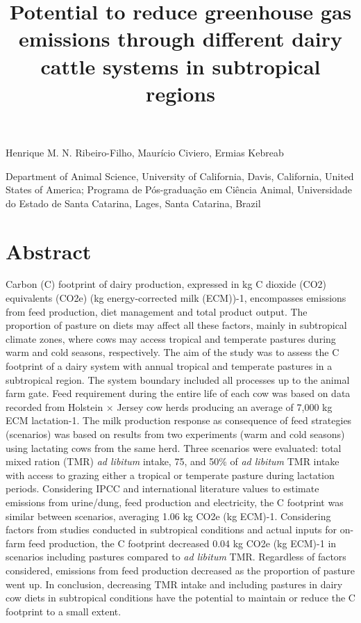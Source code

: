 \documentclass[11pt,a4paper]{article}
\title{Potential to reduce greenhouse gas emissions through different dairy cattle systems in subtropical regions}
\begin{document}
\maketitle

Henrique M. N. Ribeiro-Filho, Maurício Civiero, Ermias Kebreab

Department of Animal Science, University of California, Davis, California, United States of America; Programa de Pós-graduação em Ciência Animal, Universidade do Estado de Santa Catarina, Lages, Santa Catarina, Brazil

\section{Abstract}

Carbon (C) footprint of dairy production, expressed in kg C dioxide (CO2) equivalents (CO2e) (kg energy-corrected milk (ECM))-1, encompasses emissions from feed production, diet management and total product output. The proportion of pasture on diets may affect all these factors, mainly in subtropical climate zones, where cows may access tropical and temperate pastures during warm and cold seasons, respectively. The aim of the study was to assess the C footprint of a dairy system with annual tropical and temperate pastures in a subtropical region. The system boundary included all processes up to the animal farm gate. Feed requirement during the entire life of each cow was based on data recorded from Holstein × Jersey cow herds producing an average of 7,000 kg ECM lactation-1. The milk production response as consequence of feed strategies (scenarios) was based on results from two experiments (warm and cold seasons) using lactating cows from the same herd. Three scenarios were evaluated: total mixed ration (TMR) \textit{ad libitum} intake, 75, and 50\% of \textit{ad libitum} TMR intake with access to grazing either a tropical or temperate pasture during lactation periods. Considering IPCC and international literature values to estimate emissions from urine/dung, feed production and electricity, the C footprint was similar between scenarios, averaging 1.06 kg CO2e (kg ECM)-1. Considering factors from studies conducted in subtropical conditions and actual inputs for on-farm feed production, the C footprint decreased 0.04 kg CO2e (kg ECM)-1 in scenarios including pastures compared to \textit{ad libitum} TMR. Regardless of factors considered, emissions from feed production decreased as the proportion of pasture went up. In conclusion, decreasing TMR intake and including pastures in dairy cow diets in subtropical conditions have the potential to maintain or reduce the C footprint to a small extent.
\end{document}
